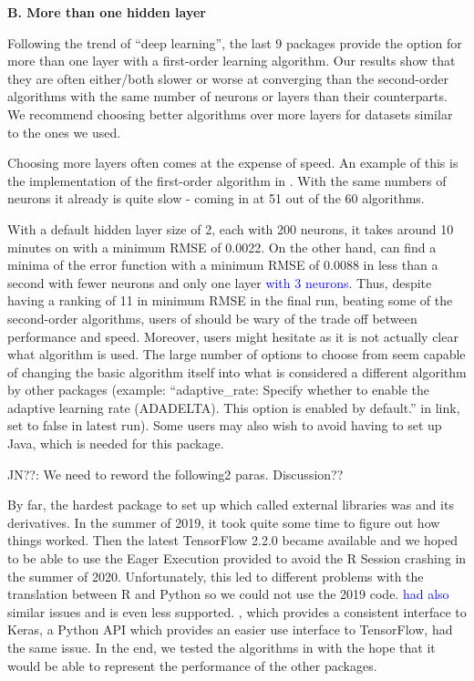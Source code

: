 \textbf{B. More than one hidden layer}

Following the trend of ``deep learning'', the last 9 packages provide
the option for more than one layer with a first-order learning
algorithm. Our results show that they are often either/both slower or
worse at converging than the second-order algorithms with the same
number of neurons or layers than their counterparts. We recommend
choosing better algorithms over more layers for datasets similar to the
ones we used.

Choosing more layers often comes at the expense of speed. An example of
this is the implementation of the first-order algorithm in 
\citep{R-h2o}. With the same numbers of neurons it already is quite slow
- coming in at 51 out of the 60 algorithms.

With a default hidden layer size of 2, each with 200 neurons, it takes
around 10 minutes on  with a minimum RMSE of 0.0022. On
the other hand,  can find a minima of the error function with
a minimum RMSE of 0.0088 in less than a second with fewer neurons and
only one layer \textcolor{blue}{with 3 neurons}. Thus, despite having a
ranking of 11 in minimum RMSE in the final run, beating some of the
second-order algorithms, users of  should be wary of the trade
off between performance and speed. Moreover, users might hesitate as it
is not actually clear what algorithm is used. The large number of
options to choose from seem capable of changing the basic algorithm
itself into what is considered a different algorithm by other packages
(example: ``adaptive\_rate: Specify whether to enable the adaptive
learning rate (ADADELTA). This option is enabled by default.'' in link,
set to false in latest run). Some users may also wish to avoid having to
set up \textsf{Java}, which is needed for this package.

JN??: We need to reword the following2 paras. Discussion??

By far, the hardest package to set up which called external libraries
was  \citep{R-tensorflow} and its derivatives. In
the summer of 2019, it took quite some time to figure out how things
worked. Then the latest TensorFlow 2.2.0 became available and we hoped
to be able to use the Eager Execution provided to avoid the \textsf{R}
Session crashing in the summer of 2020. Unfortunately, this led to
different problems with the translation between \textsf{R} and
\textsf{Python} so we could not use the 2019 code.
 \citep{R-tfestimators} \textcolor{blue}{had also}
similar issues and is even less supported. 
\citep{R-kerasR}, which provides a consistent interface to Keras, a
\textsf{Python} API which provides an easier use interface to
TensorFlow, had the same issue. In the end, we tested the algorithms in
 \citep{R-keras} with the hope that it would be able to
represent the performance of the other packages.

